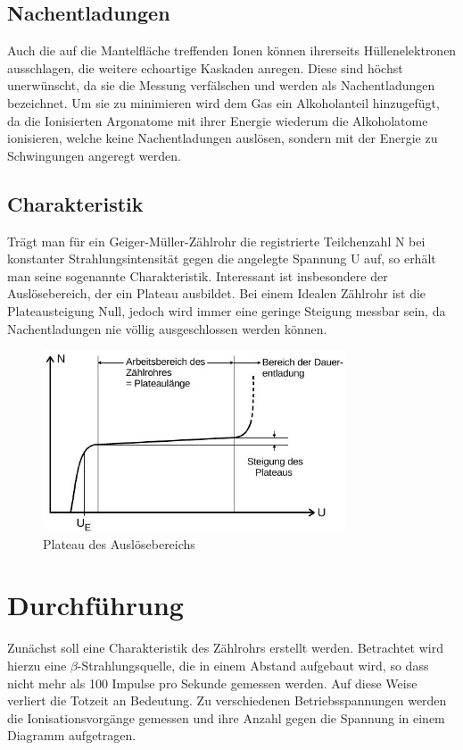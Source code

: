 \subsection{Nachentladungen}
Auch die auf die Mantelfläche treffenden Ionen können ihrerseits Hüllenelektronen ausschlagen, die weitere echoartige Kaskaden anregen. Diese sind höchst unerwünscht, da sie die Messung verfälschen und werden als Nachentladungen bezeichnet. Um sie zu minimieren wird dem Gas ein Alkoholanteil hinzugefügt, da die Ionisierten Argonatome mit ihrer Energie wiederum die Alkoholatome ionisieren, welche keine Nachentladungen auslösen, sondern mit der Energie zu Schwingungen angeregt werden.

\subsection{Charakteristik}
Trägt man für ein Geiger-Müller-Zählrohr die registrierte Teilchenzahl N bei konstanter Strahlungsintensität gegen die angelegte Spannung U auf, so erhält man seine sogenannte Charakteristik.
Interessant ist insbesondere der Auslösebereich, der ein Plateau ausbildet. Bei einem Idealen Zählrohr ist die Plateausteigung Null, jedoch wird immer eine geringe Steigung messbar sein, da Nachentladungen nie völlig ausgeschlossen werden können.
\begin{figure}[htbp]
\includegraphics[width=0.8\textwidth]{pics/plateau.jpg}
\caption{Plateau des Auslösebereichs}
\end{figure}


\section{Durchführung}
Zunächst soll eine Charakteristik des Zählrohrs erstellt werden. Betrachtet wird hierzu eine $\beta$-Strahlungsquelle, die in einem
Abstand aufgebaut wird, so dass nicht mehr als 100 Impulse pro Sekunde gemessen werden. Auf diese Weise verliert die Totzeit an Bedeutung.
Zu verschiedenen Betriebsspannungen werden die Ionisationsvorgänge gemessen und ihre Anzahl gegen die Spannung in einem Diagramm
aufgetragen.

